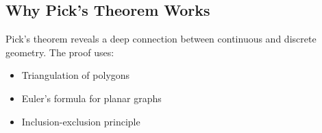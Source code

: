 
\subsection{Why Pick's Theorem Works}

Pick's theorem reveals a deep connection between continuous and discrete geometry. The proof uses:
\begin{itemize}
\item Triangulation of polygons
\item Euler's formula for planar graphs
\item Inclusion-exclusion principle
\end{itemize} 